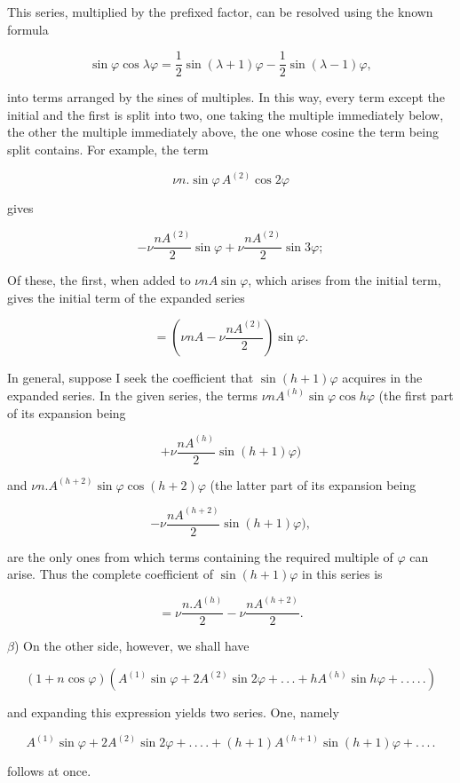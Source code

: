 \par\noindent{}%
This series, multiplied by the prefixed factor, can be resolved using the known formula

\[
\sin\varphi\cos\lambda\varphi=\frac{1}{2}\sin(\lambda+1)\varphi-\frac{1}{2}\sin(\lambda-1)\varphi,
\]

\noindent into terms arranged by the sines of multiples. In this way, every term except the initial and the first is split into two, one taking the multiple immediately below, the other the multiple immediately above, the one whose cosine the term being split contains. For example, the term

\[
\nu n . \sin\varphi\,A^{(2)}\cos2\varphi
\]

\noindent gives

\[
-\nu\frac{nA^{(2)}}{2}\sin\varphi+\nu\frac{nA^{(2)}}{2}\sin3\varphi;
\]

\noindent Of these, the first, when added to $\nu nA\sin\varphi$, which arises from the initial term, gives the initial term of the expanded series

\[
=\left(\nu nA-\nu\frac{nA^{(2)}}{2}\right)\sin\varphi.
\]

In general, suppose I seek the coefficient that $\sin(h+1)\varphi$ acquires in the expanded series. In the given series, the terms $\nu nA^{(h)}\sin\varphi\cos h\varphi$ (the first part of its expansion being

\[
+\nu\frac{nA^{(h)}}{2}\sin(h+1)\varphi)
\]

\noindent and $\nu n.A^{(h+2)}\sin\varphi\cos(h+2)\varphi$ (the latter part of its expansion being

\[
-\nu\frac{nA^{(h+2)}}{2}\sin(h+1)\varphi),
\]

\noindent are the only ones from which terms containing the required multiple of $\varphi$ can arise. Thus the complete coefficient of $\sin(h+1)\varphi$ in this series is

\[
=\nu\frac{n.A^{(h)}}{2}-\nu\frac{nA^{(h+2)}}{2}.
\]

$\beta$) On the other side, however, we shall have

\[
(1+n\cos\varphi)\left(A^{(1)}\sin\varphi+2A^{(2)}\sin2\varphi+.\,.\,.+hA^{(h)}\sin h\varphi+.\,.\,.\,.\,.\right)
\]

\noindent and expanding this expression yields two series. One, namely

\[
A^{(1)}\sin\varphi+2A^{(2)}\sin2\varphi+.\,.\,.\,.+(h+1)A^{(h+1)}\sin(h+1)\varphi+.\,.\,.\,.
\]

\noindent follows at once.
